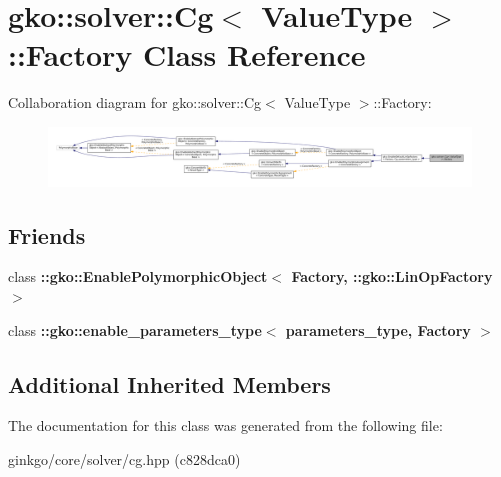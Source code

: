 \hypertarget{classgko_1_1solver_1_1Cg_1_1Factory}{}\section{gko\+:\+:solver\+:\+:Cg$<$ Value\+Type $>$\+:\+:Factory Class Reference}
\label{classgko_1_1solver_1_1Cg_1_1Factory}


Collaboration diagram for gko\+:\+:solver\+:\+:Cg$<$ Value\+Type $>$\+:\+:Factory\+:
\nopagebreak
\begin{figure}[H]
\begin{center}
\leavevmode
\includegraphics[width=350pt]{classgko_1_1solver_1_1Cg_1_1Factory__coll__graph}
\end{center}
\end{figure}
\subsection*{Friends}
\begin{DoxyCompactItemize}
\item 
\mbox{\label{classgko_1_1solver_1_1Cg_1_1Factory_a27e9bbc94a1c1c59f40833153eda8f78}} 
class {\bfseries \+::gko\+::\+Enable\+Polymorphic\+Object$<$ Factory, \+::gko\+::\+Lin\+Op\+Factory $>$}
\item 
\mbox{\label{classgko_1_1solver_1_1Cg_1_1Factory_a0d176cbd42d6214e11aee8c30ca256fc}} 
class {\bfseries \+::gko\+::enable\+\_\+parameters\+\_\+type$<$ parameters\+\_\+type, Factory $>$}
\end{DoxyCompactItemize}
\subsection*{Additional Inherited Members}


The documentation for this class was generated from the following file\+:\begin{DoxyCompactItemize}
\item 
ginkgo/core/solver/cg.\+hpp (c828dca0)\end{DoxyCompactItemize}

